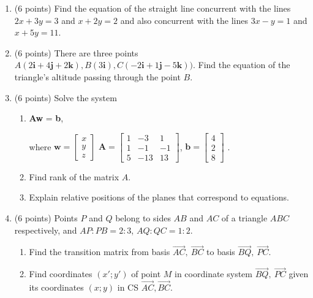 \documentclass[]{exam}
\begin{document}
\begin{enumerate}

\item (6 points) 
Find the equation of the straight line concurrent with the lines $2x + 3y = 3$ and $x + 2y = 2$ and also concurrent with the lines $3x - y = 1$ and $x + 5y = 11$.

\item (6 points)  
There are three points $A(2\textbf{i} + 4\textbf{j} + 2\textbf{k}), B(3\textbf{i}), C(-2\textbf{i} + 1\textbf{j} - 5\textbf{k}))$. Find the equation of the triangle's altitude passing through the point $B$.

\item (6 points) Solve the system 
\begin{enumerate}
    \item \textbf{Aw} = \textbf{b}, 
    
    where 
    $\textbf{w} =\begin{bmatrix}
    x \\ y \\ z
    \end{bmatrix}$
    $
\textbf{A}=\begin{bmatrix}
1 & -3 & 1 \\
1 & -1 & -1 \\
5 & -13 & 13
\end{bmatrix}$, 
$
\textbf{b}=
\begin{bmatrix}
4 \\
2 \\
8
\end{bmatrix}$
.

\item Find rank of the matrix $A$.
\item Explain relative positions of the planes that correspond to equations.
\end{enumerate} 


\item (6 points)   
Points $P$ and $Q$ belong to sides $AB$ and $AC$ of a triangle $ABC$ respectively, and $AP : PB = 2 : 3 $, $AQ : QC =1 : 2$.
\begin{enumerate}
  \item Find the transition matrix from basis $\overrightarrow{AC},\ \overrightarrow{BC}$ to basis $\overrightarrow{BQ},\ \overrightarrow{PC}$.
  \item Find coordinates $(x'; y')$ of point $M$ in coordinate system $\overrightarrow{BQ},\ \overrightarrow{PC}$ given its coordinates $(x; y)$ in CS $\overrightarrow{AC},\overrightarrow{BC}$.
\end{enumerate}



\end{enumerate}
\end{document}
